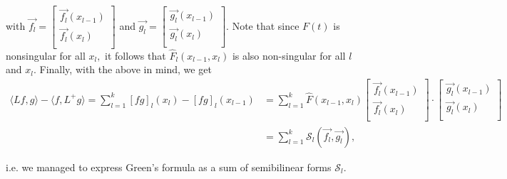 \documentclass[11pt,reqno,oneside,a4paper]{article}
\theoremstyle{plain} %
\theoremstyle{definition}
\theoremstyle{remark}
\begin{document}
with $\vec{f_l} = \begin{bmatrix}
\vec{f_l}(x_{l-1})  \\
\vec{f_l}(x_{l})  \\
\end{bmatrix}$ and $\vec{g_l} = \begin{bmatrix}
\vec{g_l}(x_{l-1})  \\
\vec{g_l}(x_{l})  \\
\end{bmatrix}.$
Note that since $F(t)$ is nonsingular for all $x_l,$ it follows that $\widehat{F}_l(x_{l-1}, x_l)$ is also non-singular for all $l$ and $x_l$. Finally, with the above in mind, we get
\begin{align*}
 \langle Lf,g\rangle - \langle f,L^+ g\rangle = \sum_{l=1}^{k} [fg]_l(x_l) - [fg]_l(x_{l-1}) &=  \sum_{l=1}^{k} \widehat{F}(x_{l-1}, x_l)  
\begin{bmatrix}
\vec{f_l}(x_{l-1})  \\
\vec{f_l}(x_{l})  \\
\end{bmatrix}
\cdot
\begin{bmatrix}
\vec{g_l}(x_{l-1})  \\
\vec{g_l}(x_{l})  \\
\end{bmatrix} \\
&=
\sum_{l=1}^{k}  \mathcal{S}_l (\vec{f_l}, \vec{g_l}),
\end{align*}


i.e. we managed to express Green's formula as a sum of semibilinear forms $\mathcal{S}_l.$
\end{document}
